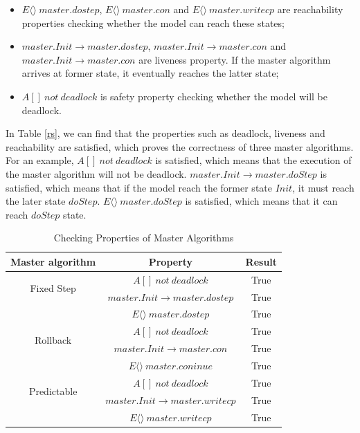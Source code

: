 \begin{itemize}
\item
$E\langle\rangle~master.dostep$, $E\langle\rangle~master.con$ and $E\langle\rangle~master.writecp$ are reachability properties checking whether the model can reach these states;
\item
$master.Init \rightarrow master.dostep$, $master.Init \rightarrow master.con$ and $master.Init \rightarrow master.con$ are liveness property. If the master algorithm arrives at former state, it eventually reaches the latter state;
\item
$A[]~not~deadlock$ is safety property checking whether the model will be deadlock.
\end{itemize}

In Table \ref{rs}, we can find that the properties such as deadlock, liveness and reachability are satisfied,  which proves the correctness of three master algorithms. For an example, $A[]~not~deadlock$ is satisfied, which means that the execution of the master algorithm will not be deadlock. $master.Init \rightarrow master.doStep$ is satisfied, which means that if the model reach the former state $Init$, it must reach the later state $doStep$. $E\langle\rangle~master.doStep$ is satisfied, which means that it can reach $doStep$ state. 

\begin{table}
\caption{Checking Properties of Master Algorithms}
\centering
\begin{tabular}{c c c}
        \hline
        Master algorithm & Property & Result\\
        \hline
        \multirow{2}{2.0cm}{Fixed Step}
                & $A[]~not~deadlock$ & True\\
                & $master.Init \rightarrow master.dostep$ & True\\
                & $E\langle\rangle~master.dostep$ & True\\

        \hline
        \multirow{2}{2.0cm}{Rollback}
                & $A[]~not~deadlock$ & True\\
                & $master.Init \rightarrow master.con$ & True\\
                & $E\langle\rangle~master.coninue$ & True\\

        \hline
        \multirow{2}{2.0cm}{Predictable}
                & $A[]~not~deadlock$ & True\\
                & $master.Init \rightarrow  master.writecp$ & True\\
                & $E\langle\rangle~master.writecp$ & True\\
        \hline
\end{tabular}
\label{ta_rs}
\end{table}